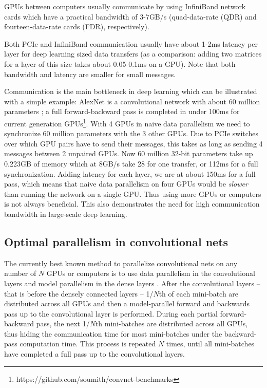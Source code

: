 \documentclass{article} %
\begin{document}
GPUs between computers usually communicate by using InfiniBand network cards which have a practical bandwidth of 3-7GB/s (quad-data-rate (QDR) and fourteen-data-rate cards (FDR), respectively).

Both PCIe and InfiniBand communication usually have about 1-2ms latency per layer for deep learning sized data transfers (as a comparison: adding two matrices for a layer of this size takes about 0.05-0.1ms on a GPU). Note that both bandwidth and latency are smaller for small messages. 

Communication is the main bottleneck in deep learning which can be illustrated with a simple example: AlexNet is a convolutional network with about 60 million parameters \citep{krizhevsky2012imagenet}; a full forward-backward pass is completed in under 100ms for current generation GPUs\footnote{https://github.com/soumith/convnet-benchmarks}. With 4 GPUs in naive data parallelism we need to synchronize 60 million parameters with the 3 other GPUs. Due to PCIe switches over which GPU pairs have to send their messages, this takes as long as sending 4 messages between 2 unpaired GPUs. Now 60 million 32-bit parameters take up 0.223GB of memory which at 8GB/s take 28 for one transfer, or 112ms for a full synchronization. Adding latency for each layer, we are at about 150ms for a full pass, which means that naive data parallelism on four GPUs would be {\it slower} than running the network on a single GPU. Thus using more GPUs or computers is not always beneficial. This also demonstrates the need for high communication bandwidth in large-scale deep learning.


\subsection{Optimal parallelism in convolutional nets}

The currently best known method to parallelize convolutional nets on any number of $N$ GPUs or computers is to use data parallelism in the convolutional layers and model parallelism in the dense layers \citep{krizhevsky2014one}. After the convolutional layers -- that is before the densely connected layers -- 1/$N$th of each mini-batch are distributed across all GPUs and then a model-parallel forward and backwards pass up to the convolutional layer is performed. During each partial forward-backward pass, the next 1/$N$th mini-batches are distributed across all GPUs, thus hiding the communication time for most mini-batches under the backward-pass computation time. This process is repeated $N$ times, until all mini-batches have completed a full pass up to the convolutional layers. 
\end{document}
